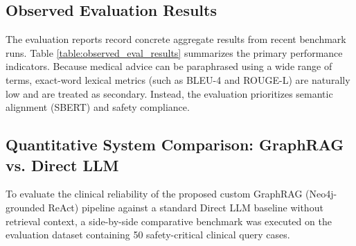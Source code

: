 \documentclass[../main.tex]{subfiles}
\begin{document}
\subsection{Observed Evaluation Results}
The evaluation reports record concrete aggregate results from recent benchmark runs. Table \ref{table:observed_eval_results} summarizes the primary performance indicators. Because medical advice can be paraphrased using a wide range of terms, exact-word lexical metrics (such as BLEU-4 and ROUGE-L) are naturally low and are treated as secondary. Instead, the evaluation prioritizes semantic alignment (SBERT) and safety compliance.

\begin{table}[H]
\centering
{}
\caption{Observed aggregate evaluation results from generated reports in \texttt{eval/}}
\label{table:observed_eval_results}
\end{table}

\subsection{Quantitative System Comparison: GraphRAG vs. Direct LLM}
To evaluate the clinical reliability of the proposed custom GraphRAG (Neo4j-grounded ReAct) pipeline against a standard Direct LLM baseline without retrieval context, a side-by-side comparative benchmark was executed on the evaluation dataset containing 50 safety-critical clinical query cases. 
\end{document}
